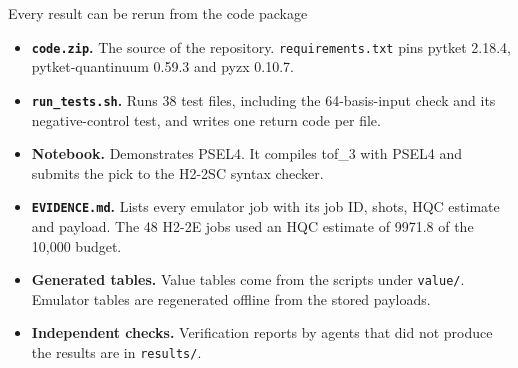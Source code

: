 \documentclass[aspectratio=169,11pt]{beamer}
\newcommand{\code}[1]{\texttt{#1}}
\begin{document}
\begin{frame}{Every result can be rerun from the code package}
  \small
  \begin{itemize}\setlength{\itemsep}{4pt}
    \item \textbf{\code{code.zip}.} The source of the repository. \code{requirements.txt} pins pytket 2.18.4, pytket-quantinuum 0.59.3 and pyzx 0.10.7.
    \item \textbf{\code{run\_tests.sh}.} Runs 38 test files, including the 64-basis-input check and its negative-control test, and writes one return code per file.
    \item \textbf{Notebook.} Demonstrates PSEL4. It compiles tof\_3 with PSEL4 and submits the pick to the H2-2SC syntax checker.
    \item \textbf{\code{EVIDENCE.md}.} Lists every emulator job with its job ID, shots, HQC estimate and payload. The 48 H2-2E jobs used an HQC estimate of 9971.8 of the 10,000 budget.
    \item \textbf{Generated tables.} Value tables come from the scripts under \code{value/}. Emulator tables are regenerated offline from the stored payloads.
    \item \textbf{Independent checks.} Verification reports by agents that did not produce the results are in \code{results/}.
  \end{itemize}
\end{frame}
\end{document}
